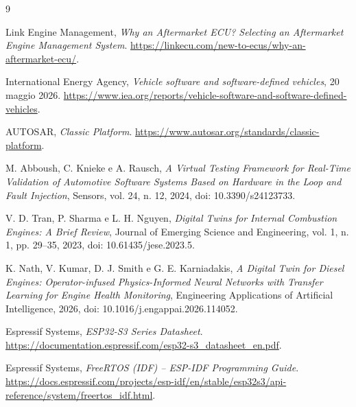 \documentclass{article}
\begin{document}
\begin{thebibliography}{9}

Link Engine Management,
\emph{Why an Aftermarket ECU? Selecting an Aftermarket Engine Management
System}.
\url{https://linkecu.com/new-to-ecus/why-an-aftermarket-ecu/}.

International Energy Agency,
\emph{Vehicle software and software-defined vehicles},
20 maggio 2026.
\url{https://www.iea.org/reports/vehicle-software-and-software-defined-vehicles}.

AUTOSAR,
\emph{Classic Platform}.
\url{https://www.autosar.org/standards/classic-platform}.

M. Abboush, C. Knieke e A. Rausch,
\emph{A Virtual Testing Framework for Real-Time Validation of Automotive
Software Systems Based on Hardware in the Loop and Fault Injection},
Sensors, vol. 24, n. 12, 2024, doi: 10.3390/s24123733.

V. D. Tran, P. Sharma e L. H. Nguyen,
\emph{Digital Twins for Internal Combustion Engines: A Brief Review},
Journal of Emerging Science and Engineering, vol. 1, n. 1, pp. 29--35,
2023, doi: 10.61435/jese.2023.5.

K. Nath, V. Kumar, D. J. Smith e G. E. Karniadakis,
\emph{A Digital Twin for Diesel Engines: Operator-infused Physics-Informed
Neural Networks with Transfer Learning for Engine Health Monitoring},
Engineering Applications of Artificial Intelligence, 2026,
doi: 10.1016/j.engappai.2026.114052.

Espressif Systems,
\emph{ESP32-S3 Series Datasheet}.
\url{https://documentation.espressif.com/esp32-s3_datasheet_en.pdf}.

Espressif Systems,
\emph{FreeRTOS (IDF) -- ESP-IDF Programming Guide}.
\url{https://docs.espressif.com/projects/esp-idf/en/stable/esp32s3/api-reference/system/freertos_idf.html}.

\end{thebibliography}
\end{document}
